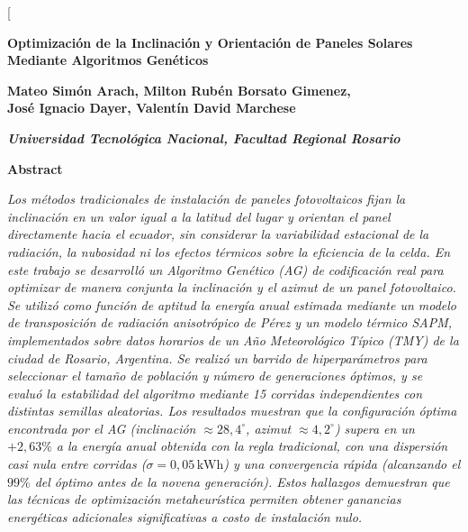 \documentclass[12pt, a4paper, twocolumn]{article}
\begin{document}
\twocolumn[
  \begin{center}

    {\fontsize{16}{20}\selectfont\bfseries Optimización de la Inclinación y Orientación de Paneles Solares Mediante Algoritmos Genéticos \par}
    \vspace{0.4cm}
    

    {\fontsize{14}{17}\selectfont\bfseries Mateo Simón Arach, Milton Rubén Borsato Gimenez,\\ José Ignacio Dayer, Valentín David Marchese \par} 
    \vspace{0.2cm}
    
    {\fontsize{12}{15}\selectfont\bfseries\itshape Universidad Tecnológica Nacional, Facultad Regional Rosario \par}
    \vspace{0.6cm}
  \end{center}


  \noindent\textbf{\fontsize{10}{12}\selectfont Abstract} \\
  {\fontsize{10}{12}\selectfont\itshape
  Los métodos tradicionales de instalación de paneles fotovoltaicos fijan la inclinación en un valor igual a la latitud del lugar y orientan el panel directamente hacia el ecuador, sin considerar la variabilidad estacional de la radiación, la nubosidad ni los efectos térmicos sobre la eficiencia de la celda. En este trabajo se desarrolló un Algoritmo Genético (AG) de codificación real para optimizar de manera conjunta la inclinación y el azimut de un panel fotovoltaico. Se utilizó como función de aptitud la energía anual estimada mediante un modelo de transposición de radiación anisotrópico de Pérez y un modelo térmico SAPM, implementados sobre datos horarios de un Año Meteorológico Típico (TMY) de la ciudad de Rosario, Argentina. Se realizó un barrido de hiperparámetros para seleccionar el tamaño de población y número de generaciones óptimos, y se evaluó la estabilidad del algoritmo mediante 15 corridas independientes con distintas semillas aleatorias. Los resultados muestran que la configuración óptima encontrada por el AG (inclinación $\approx 28,4^\circ$, azimut $\approx 4,2^\circ$) supera en un $+2,63\%$ a la energía anual obtenida con la regla tradicional, con una dispersión casi nula entre corridas ($\sigma = 0,05\,\text{kWh}$) y una convergencia rápida (alcanzando el $99\%$ del óptimo antes de la novena generación). Estos hallazgos demuestran que las técnicas de optimización metaheurística permiten obtener ganancias energéticas adicionales significativas a costo de instalación nulo.
  \par}
  \vspace{0.3cm}
\end{document}
